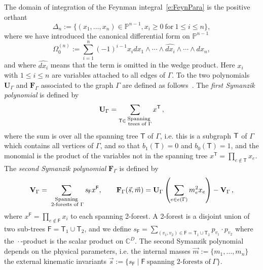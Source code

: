 \documentclass[a4paper,12pt]{article}
\numberwithin{equation}{section}
\numberwithin{figure}{section}
\begin{document}
\label{sec:griff-dwork-reduct}
The domain of integration of the Feynman integral~\eqref{e:FeynPara}  is the positive orthant
\begin{equation}\label{e:Deltan}
	\Delta_n:=\{(x_1,\dots,x_n)\in \mathbb P^{n-1}, x_i \geq0 ~\textrm{for}~ 1\leq
	i\leq n\},
\end{equation}
where we have introduced the  canonical differential form on
$\mathbb P^{n-1}$ 
% 
\begin{equation}
	\Omega_0^{(n)}:=  \sum_{i=1}^n (-1)^{i-1} x_i dx_1\wedge \cdots \wedge \widehat{dx_i} \wedge\cdots \wedge dx_n ,
\end{equation}
and where  $\widehat{dx_i}$ means that the term is omitted in the wedge
product.
Here  $x_i$ with $1\leq i\leq n$  are  variables attached to all edges of
$\Gamma$.
%
To the two polynomials $\textbf{U}_\Gamma$ and $\textbf{F}_\Gamma$
associated to the graph $\Gamma$ are defined as
follows~\cite{nakanishi1971graph,Weinzierl:2022eaz}.  The {\em first
Symanzik polynomial} is defined by
\begin{equation}\label{e:Udef}
{\bf U}_\Gamma = \sum_{\mathsf{T} \in \substack{ \text{Spanning} \\ \text{ trees of } \Gamma}} x^{\mathsf{T}}\,, 
\end{equation}
where the sum is over all the spanning tree $\mathsf{T}$ of $\Gamma$,
i.e.  this is a subgraph ${\sf T}$ of $\Gamma$ which contains all
vertices of $\Gamma$, and so that $b_1(\mathsf{T}) =0$ and
$b_0(\mathsf{T})=1$, and the
monomial is the product of the variables not in the spanning tree
$x^{\mathsf{T}} = \prod_{e\notin {\mathsf{T}}} x_e$. 
The {\em second 
Symanzik polynomial}  $\textbf{F}_\Gamma$ is defined by
\begin{equation}\label{e:VFdef}
{\bf V}_{\Gamma} = \sum_{\substack{ \text{Spanning} \\ \text{ 2-forests
			of } \Gamma}}s_{\mathsf{F}} x^{\mathsf{F}}  ,\qquad {\bf F}_{\Gamma}(\vec{s}, \vec{m}) = {\bf U}_\Gamma\left( \sum_{e \in e(\Gamma)} m_e^2 x_e\right) - {\bf V}_{\Gamma}\,,
\end{equation}
where $x^{\mathsf{F}} =
\prod_{e \notin \mathsf{F}} x_i$ to each spanning 2-forest. A 2-forest
is a disjoint union of two sub-trees $\mathsf{F}=\mathsf{T}_1\cup \mathsf{T}_2$,  and we define $s_\mathsf{F} = \sum_{(v_1,v_2) \in \mathsf{F}=\mathsf{T}_1\cup \mathsf{T}_2} p_{v_1}\cdot p_{v_2}$ where the ${}\cdot{}$-product is the
scalar product on $\mathbb {C}^{D}$.
The second Symanzik polynomial depends on the physical parameters,
i.e. the
internal masses $\vec m:=\{m_1,\dots,m_n\}$ the external kinematic invariants
$\vec s:=\{s_\textsf{F} \mid \textsf{F} ~ \textrm{spanning
2-forests of}~\Gamma\}$.
\end{document}
